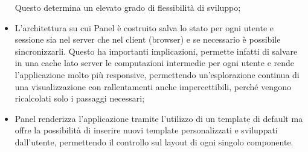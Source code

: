 \begin{itemize}
\begin{itemize}
	\end{itemize}
	
Questo determina un elevato grado di flessibilità di sviluppo;

\item L'architettura su cui Panel è costruito salva lo stato per ogni utente e sessione sia nel server che nel client (browser) e se necessario è possibile sincronizzarli. Questo ha importanti implicazioni, permette infatti di salvare in una cache lato server le computazioni intermedie per ogni utente e rende l'applicazione molto più responsive, permettendo un'esplorazione continua di una visualizzazione con rallentamenti anche impercettibili, perché vengono ricalcolati solo i passaggi necessari; 

\item Panel renderizza l'applicazione tramite l'utilizzo di un template di default ma offre la possibilità di inserire nuovi template personalizzati e sviluppati dall'utente, permettendo il controllo sul layout di ogni singolo componente.

\end{itemize}



